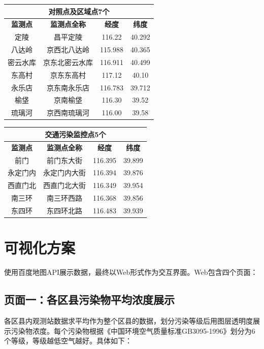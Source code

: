﻿\documentclass{article}
\begin{document}
\begin{CJK*}{GBK}{song}
\begin{center}
\begin{tabular}{|c|c|c|c|} \hline
\multicolumn{4}{|c|}{\textbf{对照点及区域点7个}} \\ \hline
\textbf{监测点} & \textbf{监测点全称} & \textbf{经度} & \textbf{纬度} \\ \hline
定陵 & 昌平定陵 & 116.22 & 40.292 \\ \hline
八达岭 & 京西北八达岭 & 115.988 & 40.365 \\ \hline
密云水库 & 京东北密云水库 & 116.911 & 40.499 \\ \hline
东高村 & 京东东高村 & 117.12 & 40.10 \\ \hline
永乐店 & 京东南永乐店 & 116.783 & 39.712 \\ \hline
榆垡 & 京南榆垡 & 116.30 & 39.52 \\ \hline
琉璃河 & 京西南琉璃河 & 116.00 & 39.58 \\ \hline
\end{tabular}

\begin{tabular}{|c|c|c|c|} \hline
\multicolumn{4}{|c|}{\textbf{交通污染监控点5个}} \\ \hline
\textbf{监测点} & \textbf{监测点全称} & \textbf{经度} & \textbf{纬度} \\ \hline
前门 & 前门东大街 & 116.395 & 39.899 \\ \hline
永定门内 & 永定门内大街 & 116.394 & 39.876 \\ \hline
西直门北 & 西直门北大街 & 116.349 & 39.954 \\ \hline
南三环 & 南三环西路 & 116.368 & 39.856 \\ \hline
东四环 & 东四环北路 & 116.483 & 39.939 \\ \hline
\end{tabular}
\end{center}


\section{可视化方案}
\qquad 使用百度地图API展示数据，最终以Web形式作为交互界面。Web包含四个页面：

\subsection{页面一：各区县污染物平均浓度展示}
\qquad 各区县内观测站数据求平均作为整个区县的数据，划分污染等级后用图层透明度展示污染物浓度。每个污染物根据《中国环境空气质量标准GB3095-1996》划分为6个等级，等级越低空气越好。具体如下：


\end{CJK*}
\end{document}

